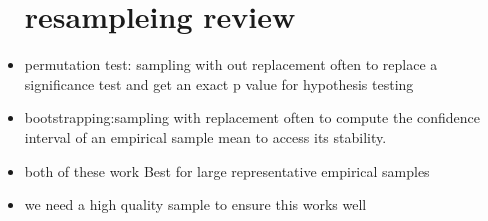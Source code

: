 \documentclass{article}
\begin{document}
\begin{itemize}
\section{resampleing review}
\item permutation test: sampling with out replacement often to replace a significance test and get an exact p value for hypothesis testing 
\item bootstrapping:sampling with replacement often to compute the confidence interval of an empirical sample mean to access its stability. 
\item both of these work Best for large representative empirical samples
\item we need a high quality sample to ensure this works well
    


\end{itemize}
\end{document}
